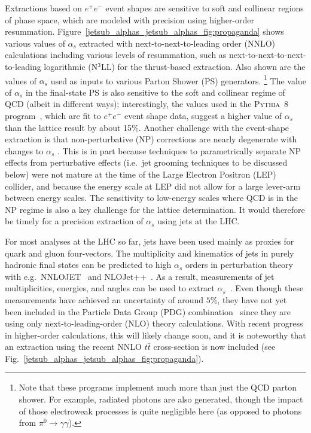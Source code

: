 \documentclass[11pt]{cernrep}
\begin{document}
Extractions based on $e^+e^-$ event shapes are sensitive to soft and collinear regions of phase space, which are modeled with precision
using higher-order resummation.
%
Figure~\ref{jetsub_alphas_jetsub_alphas_fig:propaganda} shows various values of $\alpha_s$ extracted with next-to-next-to-leading order (NNLO) calculations including various levels of resummation, such as next-to-next-to-next-to-leading logarithmic (N$^3$LL) for the thrust-based extraction.
%
Also shown are the values of $\alpha_s$ used as inputs to various Parton Shower (PS) generators.%
\footnote{Note that these programs implement much more than just the QCD parton shower.  For example, radiated photons are also generated, though the impact of those electroweak processes is quite negligible here (as opposed to photons from $\pi^0\rightarrow\gamma\gamma$).}
%
The value of $\alpha_s$ in the final-state PS is also sensitive to the soft and collinear regime of QCD (albeit in different ways); interestingly, the values used in the \textsc{Pythia~8} program~\cite{Sjostrand:2006za,Sjostrand:2007gs}, which are fit to $e^+e^-$ event shape data, suggest a higher value of $\alpha_s$ than the lattice result by about 15\%.
%
Another challenge with the event-shape extraction is that non-perturbative (NP) corrections are nearly degenerate with changes to $\alpha_s$ \cite{Abbate:2010xh}.
%
This is in part because techniques to parametrically separate NP effects from perturbative effects (i.e.~jet grooming techniques to be discussed below) were not mature at the time of the Large Electron Positron (LEP) collider, and because the energy scale at LEP did not allow for a large lever-arm between energy scales.
%
The sensitivity to low-energy scales where QCD is in the NP regime is also a key challenge for the lattice determination.
%
It would therefore be timely for a precision extraction of $\alpha_s$ using jets at the LHC.

For most analyses at the LHC so far, jets have been used mainly as proxies for quark and gluon four-vectors.
%
The multiplicity and kinematics of jets in purely hadronic final states can be predicted to high $\alpha_s$ orders in perturbation theory with e.g.\ NNLOJET~\cite{Currie:2016bfm,Currie:2017ctp} and NLOJet++~\cite{Nagy:2001fj,Nagy:2003tz}.
%
As a result, measurements of jet multiplicities, energies, and angles can be used to extract $\alpha_s$~\cite{ATLAS:2015yaa,Aaboud:2017fml,Khachatryan:2014waa,CMS:2014mna,Chatrchyan:2013txa}.
%
Even though these measurements have achieved an uncertainty of around $5\%$, they have not yet been included in the Particle Data Group (PDG) combination~\cite{Olive:2016xmw} since they are using only next-to-leading-order (NLO) theory calculations.
%
With recent progress in higher-order calculations, this will likely change soon, and it is noteworthy that an extraction using the recent NNLO $t\bar{t}$ cross-section \cite{Czakon:2013goa} is now included (see Fig.~\ref{jetsub_alphas_jetsub_alphas_fig:propaganda}).
\end{document}
